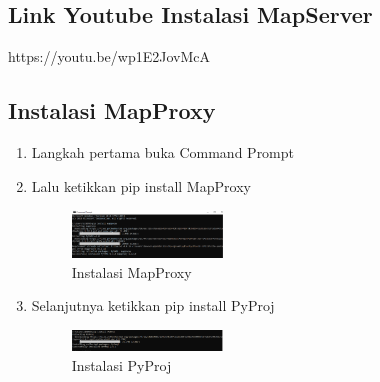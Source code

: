 \subsection{Link Youtube Instalasi MapServer}
{https://youtu.be/wp1E2JovMcA}

\subsection{Instalasi MapProxy}
\begin{enumerate}
  \item Langkah pertama buka Command Prompt
  \item Lalu ketikkan pip install MapProxy
  \hfill\break
  \begin{figure}[H]
  \includegraphics[width=4cm]{figures/tugas4/1174069/13.png}
  \centering
  \caption{Instalasi MapProxy}
  \end{figure}
  
  \item Selanjutnya ketikkan pip install PyProj
  \hfill\break
  \begin{figure}[H]
  \includegraphics[width=4cm]{figures/tugas4/1174069/14.png}
  \centering
  \caption{Instalasi PyProj}
  \end{figure}
\end{enumerate}

